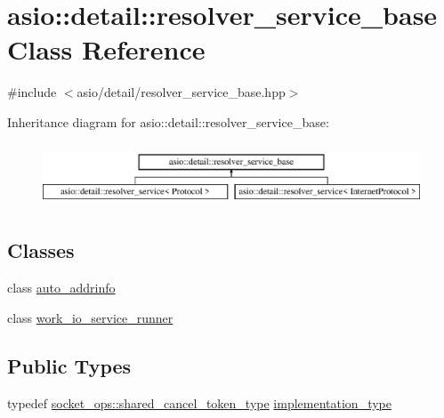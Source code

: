 \hypertarget{classasio_1_1detail_1_1resolver__service__base}{}\section{asio\+:\+:detail\+:\+:resolver\+\_\+service\+\_\+base Class Reference}
\label{classasio_1_1detail_1_1resolver__service__base}


{\ttfamily \#include $<$asio/detail/resolver\+\_\+service\+\_\+base.\+hpp$>$}

Inheritance diagram for asio\+:\+:detail\+:\+:resolver\+\_\+service\+\_\+base\+:\begin{figure}[H]
\begin{center}
\leavevmode
\includegraphics[height=1.904762cm]{classasio_1_1detail_1_1resolver__service__base}
\end{center}
\end{figure}
\subsection*{Classes}
\begin{DoxyCompactItemize}
\item 
class \hyperlink{classasio_1_1detail_1_1resolver__service__base_1_1auto__addrinfo}{auto\+\_\+addrinfo}
\item 
class \hyperlink{classasio_1_1detail_1_1resolver__service__base_1_1work__io__service__runner}{work\+\_\+io\+\_\+service\+\_\+runner}
\end{DoxyCompactItemize}
\subsection*{Public Types}
\begin{DoxyCompactItemize}
\item 
typedef \hyperlink{namespaceasio_1_1detail_1_1socket__ops_a6f7dec33c65c050a3ee96d6b17dafc9c}{socket\+\_\+ops\+::shared\+\_\+cancel\+\_\+token\+\_\+type} \hyperlink{classasio_1_1detail_1_1resolver__service__base_ab07ff8adc9e2f3d5841021e99e190c16}{implementation\+\_\+type}
\end{DoxyCompactItemize}
